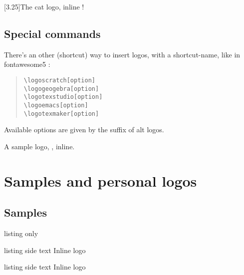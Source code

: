 \documentclass[11pt,a4paper]{ltxdoc}
\begin{document}
\begin{tcblisting}{}
\scalebox{3.25}[3.25]{\ttfamily The cat  logo, inline !}
\end{tcblisting}

\subsection{Special commands}

There's an other (shortcut) way to insert logos, with a shortcut-name, like in \textsf{fontawesome5} :

\begin{quote}
\begin{verbatim}
\logoscratch[option]
\logogeogebra[option]
\logotexstudio[option]
\logoemacs[option]
\logotexmaker[option]
\end{verbatim}
\end{quote}

Available options are given by the suffix of alt logos.

\begin{tcblisting}{}
A sample logo, \logoemacs[alt], inline.
\end{tcblisting}

\pagebreak

\section{Samples and personal logos}

\subsection{Samples}

\begin{tcblisting}{listing only}
\newcommand\samplevectorlogo[1]{{\LARGE Inline {#1} logo}\par}
\end{tcblisting}

\newcommand\samplevectorlogo[1]{{\LARGE Inline {#1} logo}\par}

\begin{tcblisting}{listing side text}
\samplevectorlogo{\logogeogebra}
\end{tcblisting}

\begin{tcblisting}{listing side text}
\samplevectorlogo{\logogeogebra[icon]}
\end{tcblisting}
\end{document}
